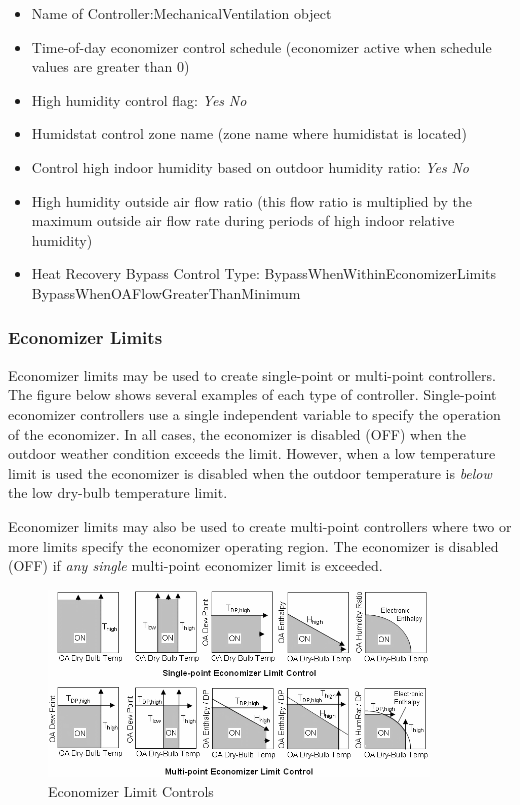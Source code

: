 \begin{itemize}
\item
  Name of Controller:MechanicalVentilation object
\item
  Time-of-day economizer control schedule (economizer active when schedule values are greater than 0)
\item
  High humidity control flag: \emph{Yes} \textbar{} \emph{No}
\item
  Humidstat control zone name (zone name where humidistat is located)
\item
  Control high indoor humidity based on outdoor humidity ratio: \emph{Yes} \textbar{} \emph{No}
\item
  High humidity outside air flow ratio (this flow ratio is multiplied by the maximum outside air flow rate during periods of high indoor relative humidity)
\item
  Heat Recovery Bypass Control Type: BypassWhenWithinEconomizerLimits \textbar{} BypassWhenOAFlowGreaterThanMinimum
\end{itemize}

\subsubsection{Economizer Limits}\label{economizer-limits}

Economizer limits may be used to create single-point or multi-point controllers. The figure below shows several examples of each type of controller. Single-point economizer controllers use a single independent variable to specify the operation of the economizer. In all cases, the economizer is disabled (OFF) when the outdoor weather condition exceeds the limit. However, when a low temperature limit is used the economizer is disabled when the outdoor temperature is \emph{below} the low dry-bulb temperature limit.

Economizer limits may also be used to create multi-point controllers where two or more limits specify the economizer operating region. The economizer is disabled (OFF) if \emph{any single} multi-point economizer limit is exceeded.

\begin{figure}[hbtp] %
\centering
\includegraphics[width=0.9\textwidth, height=0.9\textheight, keepaspectratio=true]{media/image4411.png}
\caption{Economizer Limit Controls \protect \label{fig:economizer-limit-controls}}
\end{figure}

